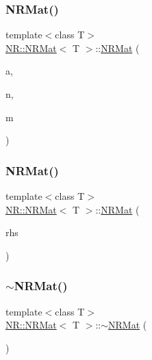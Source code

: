 \mbox{\label{classNR_1_1NRMat_a30ddcc485a9e735b1fafbb56022fdc3a}} 
\subsubsection{\texorpdfstring{NRMat()}{NRMat()}\hspace{0.1cm}{\footnotesize\ttfamily [9/10]}}
{\footnotesize\ttfamily template$<$class T$>$ \\
\mbox{\hyperlink{classNR_1_1NRMat}{N\+R\+::\+N\+R\+Mat}}$<$ T $>$\+::\mbox{\hyperlink{classNR_1_1NRMat}{N\+R\+Mat}} (\begin{DoxyParamCaption}\item[{const T $\ast$}]{a,  }\item[{int}]{n,  }\item[{int}]{m }\end{DoxyParamCaption})}

\mbox{\label{classNR_1_1NRMat_a7ad1dc6f56c44d5d0a7b595d48206cfa}} 
\subsubsection{\texorpdfstring{NRMat()}{NRMat()}\hspace{0.1cm}{\footnotesize\ttfamily [10/10]}}
{\footnotesize\ttfamily template$<$class T$>$ \\
\mbox{\hyperlink{classNR_1_1NRMat}{N\+R\+::\+N\+R\+Mat}}$<$ T $>$\+::\mbox{\hyperlink{classNR_1_1NRMat}{N\+R\+Mat}} (\begin{DoxyParamCaption}\item[{const \mbox{\hyperlink{classNR_1_1NRMat}{N\+R\+Mat}}$<$ T $>$ \&}]{rhs }\end{DoxyParamCaption})}

\mbox{\label{classNR_1_1NRMat_a8b6826b7a7556a397ee7d7ad382e5dae}} 
\subsubsection{\texorpdfstring{$\sim$NRMat()}{~NRMat()}\hspace{0.1cm}{\footnotesize\ttfamily [2/2]}}
{\footnotesize\ttfamily template$<$class T$>$ \\
\mbox{\hyperlink{classNR_1_1NRMat}{N\+R\+::\+N\+R\+Mat}}$<$ T $>$\+::$\sim$\mbox{\hyperlink{classNR_1_1NRMat}{N\+R\+Mat}} (\begin{DoxyParamCaption}{ }\end{DoxyParamCaption})}



